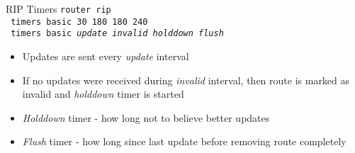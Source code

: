 \begin{frame}{RIP Timers}
	\texttt{router rip
		\\~timers basic 30 180 180 240
		\\~timers basic \textit{update invalid holddown flush}
	}\pause
	\begin{itemize}[<+->]
		\item Updates are sent every \textit{update} interval
		\item If no updates were received during \textit{invalid} interval, then route is marked as invalid and \textit{holddown} timer is started
		\item \textit{Holddown} timer - how long not to believe better updates
		\item \textit{Flush} timer - how long since last update before removing route completely
	\end{itemize}
\end{frame}
